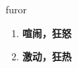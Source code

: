 
\begin{frame}
{\huge furor}
\begin{center}
\begin{enumerate}\Large
  \item \textbf{喧闹，狂怒}
  \item \textbf{激动，狂热}
\end{enumerate}
\end{center}
\end{frame}
